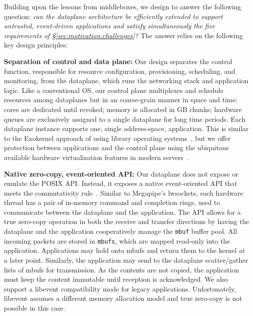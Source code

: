 
Building upon the lessons from middleboxes, we design \ix to answer
the following question: {\it can the dataplane architecture be
  efficiently extended to support untrusted, event-driven applications
  and satisfy simultaneously the five requirements of
  \S\ref{sec:motivation:challenges}?}  The answer relies on the
following key design principles:


{\bf Separation of control and data plane:} 
Our design separates the control function, responsible for resource
configuration, provisioning, scheduling, and monitoring, from the
dataplane, which runs the networking stack and application logic.
Like a conventional OS, our control plane multiplexes and schedule
resources among dataplanes but in an coarse-grain manner in space and
time: cores are dedicated until revoked; memory is allocated in GB
chunks; hardware queues are exclusively assigned to a single dataplane
for long time periods. Each dataplane instance supports one, single
address-space, application.  This is similar to the Exokernel approach
of using library operating systems~\cite{DBLP:conf/sosp/EnglerKO95},
but we offer protection between applications and the control plane
using the ubiquitous available hardware virtualization features in
modern
servers~\cite{DBLP:journals/computer/UhligNRSMABKLS05,belay2012dune}.

{\bf Native zero-copy, event-oriented API:} Our dataplane does not
expose or emulate the POSIX API.  Instead, it exposes a native
event-oriented API that meets the commutativity
rule~\cite{DBLP:conf/sosp/ClementsKZMK13}. Similar to Megapipe's
lwsockets, each hardware thread  has a
pair of in-memory command and completion rings, used to communicate
between the dataplane and the application. The API allows for a true
zero-copy operation in both the receive and transfer directions by
having the dataplane and the application cooperatively manage the
\texttt{mbuf} buffer pool.  All incoming packets are stored in
\texttt{mbufs}, which are mapped read-only into the
application. Applications may hold onto mbufs and return them to the
kernel at a later point.  Similarly, the application may send to the
dataplane scatter/gather lists of mbufs for transmission. As the
contents are not copied, the application must keep the content
immutable until reception is acknowledged.  We also support a libevent
compatibility mode for legacy applications. Unfortunately, libevent
assumes a different memory allocation model and true zero-copy is not
possible in this case. 


